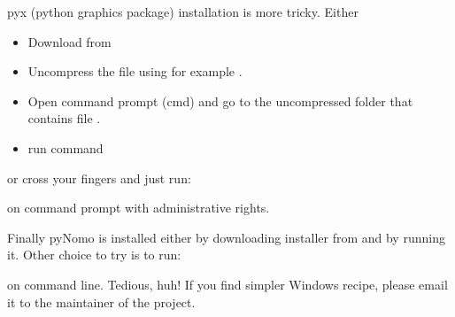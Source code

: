 \documentclass[a4paper,11pt,english]{sphinxmanual}
\begin{document}
pyx (python graphics package) installation is more tricky. Either
\begin{itemize}
\item {} 
Download  from 

\item {} 
Uncompress the file  using for example .

\item {} 
Open command prompt (cmd) and go to the uncompressed folder that contains file .

\item {} 
run command 

\end{itemize}

or cross your fingers and just run:

\begin{sphinxVerbatim}[commandchars=\\\{\},formatcom=\scriptsize]
     
\end{sphinxVerbatim}

on command prompt with administrative rights.

Finally pyNomo is installed either by downloading installer from   and by running it. Other choice to try is to run:

\begin{sphinxVerbatim}[commandchars=\\\{\},formatcom=\scriptsize]
   
\end{sphinxVerbatim}

on command line. Tedious, huh! If you find simpler Windows recipe, please email it to the maintainer of the project.
\end{document}
